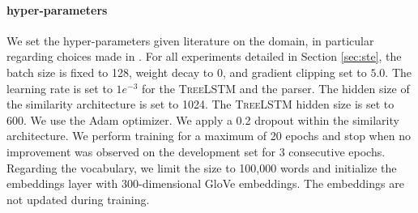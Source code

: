 \paragraph{hyper-parameters} We set the hyper-parameters given literature on the domain, in particular regarding choices made in \textcite{choi_18}. For all experiments detailed in Section \ref{sec:ste}, the batch size is fixed to 128, weight decay to $0$, and gradient clipping set to $5.0$. The learning rate is set to $1e^{-3}$ for the \textsc{TreeLSTM} and the parser. The hidden size of the similarity architecture is set to 1024. The \textsc{TreeLSTM} hidden size is set to 600. We use the Adam optimizer. We apply a 0.2 dropout within the similarity architecture. We perform training for a maximum of 20 epochs and stop when no improvement was observed on the development set for 3 consecutive epochs.
Regarding the vocabulary, we limit the size to 100,000 words and initialize the embeddings layer with 300-dimensional GloVe embeddings. The embeddings are not updated during training. %

